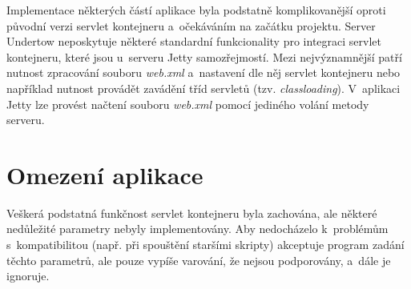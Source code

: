         Implementace některých částí aplikace byla podstatně komplikovanější oproti původní verzi servlet kontejneru
        a~očekáváním na začátku projektu. Server Undertow 
        neposkytuje některé standardní funkcionality pro integraci servlet kontejneru, které
        jsou u~serveru Jetty samozřejmostí. Mezi nejvýznamnější patří nutnost
        zpracování souboru \emph{web.xml} a~nastavení dle něj servlet kontejneru nebo například nutnost 
        provádět zavádění tříd servletů (tzv. \emph{classloading}). V~aplikaci Jetty lze provést načtení 
        souboru \emph{web.xml} pomocí jediného volání metody serveru.

        
    \section{Omezení aplikace} \label{implOmezeni}
        Veškerá podstatná funkčnost servlet kontejneru byla zachována,
        ale některé nedůležité parametry nebyly implementovány. Aby nedocházelo
        k~problémům s~kompatibilitou (např. při spouštění staršími skripty) akceptuje program zadání těchto
        parametrů, ale pouze vypíše varování, že nejsou podporovány,   a~dále je ignoruje.
        
